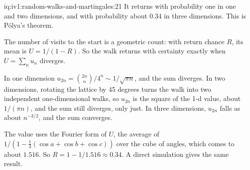 \begin{solution}{iq:iv1:random-walks-and-martingales:21}
It returns with probability one in one and two dimensions, and with probability about $0.34$ in three dimensions. This is P\'olya's theorem.

The number of visits to the start is a geometric count: with return chance $R$, its mean is $U = 1/(1 - R)$. So the walk returns with certainty exactly when $U = \sum_n u_n$ diverges.

In one dimension $u_{2n} = \binom{2n}{n}/4^n \sim 1/\sqrt{\pi n}$, and the sum diverges. In two dimensions, rotating the lattice by 45 degrees turns the walk into two independent one-dimensional walks, so $u_{2n}$ is the square of the 1-d value, about $1/(\pi n)$, and the sum still diverges, only just. In three dimensions, $u_{2n}$ falls as about $n^{-3/2}$, and the sum converges.

The value uses the Fourier form of $U$, the average of $1/(1 - \tfrac13(\cos a + \cos b + \cos c))$ over the cube of angles, which comes to about $1.516$. So $R = 1 - 1/1.516 \approx 0.34$. A direct simulation gives the same result.

\end{solution}

